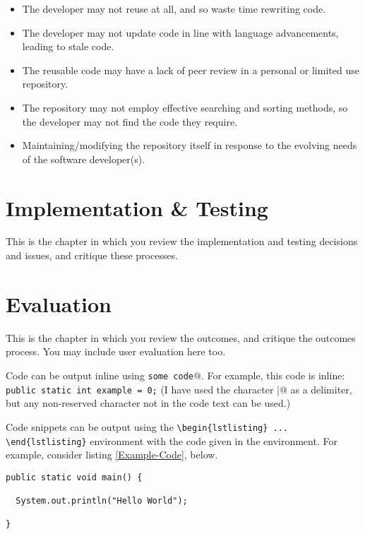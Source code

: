 \documentclass[11pt,openright,a4paper]{report}
\begin{document}
\begin{itemize}
\item The developer may not reuse at all, and so waste time rewriting code.
\item The developer may not update code in line with language advancements, leading to stale code. 
\item The reusable code may have a lack of peer review in a personal or limited use repository.
\item The repository may not employ effective searching and sorting methods, so the developer may not find the code they require.
\item Maintaining/modifying the repository itself in response to the evolving needs of the software developer(s). 
\end{itemize}








\chapter{Implementation \& Testing}
This is the chapter in which you review the implementation and testing
decisions and issues, and critique these processes.


\chapter{Evaluation}
This is the chapter in which you review the outcomes, and
critique the outcomes process.  You may include user evaluation here
too.

Code can be output inline using \verb@\lstinline|some code|@.  For example,
this code is inline: \lstinline|public static int example = 0;|  (I have
used the character \verb@|@ as a delimiter, but any non-reserved character
not in the code text can be used.)

Code snippets can be output using the \verb|\begin{lstlisting} ... \end{lstlisting}|
environment with the code given in the environment.  For
example, consider listing \ref{Example-Code}, below.

\begin{lstlisting}[breaklines,breakatwhitespace,caption={Example code},label=Example-Code]
public static void main() {

  System.out.println("Hello World");

}
\end{lstlisting}
\end{document}
